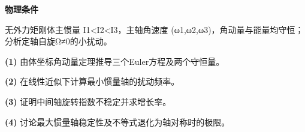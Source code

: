 \textbf{物理条件}\par 无外力矩刚体主惯量 I1<I2<I3，主轴角速度 (ω1,ω2,ω3)，角动量与能量均守恒；分析定轴自旋Ω≠0的小扰动。
\par\noindent\textbf{(1)} 由体坐标角动量定理推导三个Euler方程及两个守恒量。
\par\noindent\textbf{(2)} 在线性近似下计算最小惯量轴的扰动频率。
\par\noindent\textbf{(3)} 证明中间轴旋转指数不稳定并求增长率。
\par\noindent\textbf{(4)} 讨论最大惯量轴稳定性及不等式退化为轴对称时的极限。
